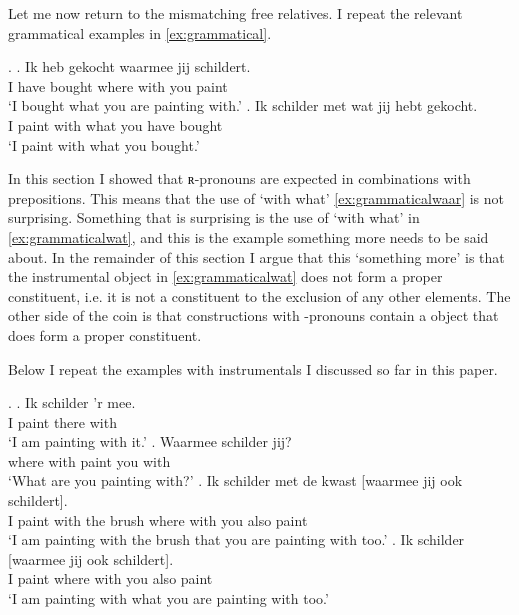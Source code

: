 \documentclass[12pt]{article}
\begin{document}
Let me now return to the mismatching free relatives. I repeat the relevant grammatical examples in \ref{ex:grammatical}.

\ex.\label{ex:grammatical}
\ag. Ik heb gekocht waarmee jij schildert.\\
 I have bought {where with} you paint\\
 `I bought what you are painting with.'\label{ex:grammaticalwaar}
\bg. Ik schilder met wat jij hebt gekocht.\\
 I paint with what you have bought\\
 `I paint with what you bought.'\label{ex:grammaticalwat}

In this section I showed that ʀ-pronouns are expected in combinations with prepositions. This means that the use of  `with what' \ref{ex:grammaticalwaar} is not surprising. Something that is surprising is the use of  `with what' in \ref{ex:grammaticalwat}, and this is the example something more needs to be said about. In the remainder of this section I argue that this `something more' is that the instrumental object in \ref{ex:grammaticalwat} does not form a proper constituent, i.e. it is not a constituent to the exclusion of any other elements. The other side of the coin is that constructions with -pronouns contain a object that does form a proper constituent.

Below I repeat the examples with instrumentals I discussed so far in this paper.

\ex.
\ag. Ik schilder 'r mee.\\
 I paint there with\\
 `I am painting with it.'\label{ex:const1}
\bg. Waarmee schilder jij?\\
{where with} paint you with\\
 `What are you painting with?'\label{ex:const2}
\bg. Ik schilder met de kwast [waarmee jij ook schildert].\\
 I paint with the brush {where with} you also paint\\
 `I am painting with the brush that you are painting with too.'\label{ex:const3}
\bg. Ik schilder [waarmee jij ook schildert].\\
 I paint {where with} you also paint\\
 `I am painting with what you are painting with too.'\label{ex:const4}
\end{document}
